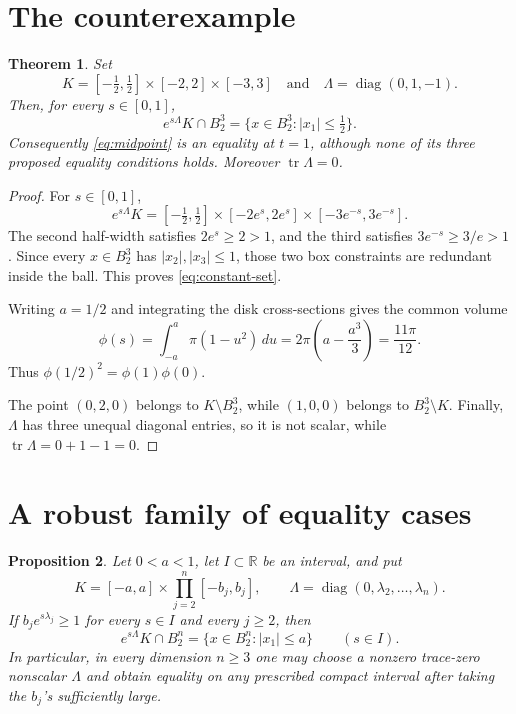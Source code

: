 \documentclass[11pt]{article}
\newtheorem{theorem}{Theorem}
\newtheorem{proposition}[theorem]{Proposition}
\newcommand{\B}{B_2}
\begin{document}
\section{The counterexample}

\begin{theorem}\label{thm:counterexample}
Set
\[
 K=[-\tfrac12,\tfrac12]\times[-2,2]\times[-3,3]
 \quad\text{and}\quad
 \Lambda=\operatorname{diag}(0,1,-1).
\]
Then, for every \(s\in[0,1]\),
\begin{equation}\label{eq:constant-set}
 e^{s\Lambda}K\cap\B^3
 =\{x\in\B^3:|x_1|\le\tfrac12\}.
\end{equation}
Consequently \eqref{eq:midpoint} is an equality at \(t=1\), although none
of its three proposed equality conditions holds.  Moreover
\(\operatorname{tr}\Lambda=0\).
\end{theorem}

\begin{proof}
For \(s\in[0,1]\),
\[
 e^{s\Lambda}K
 =[-\tfrac12,\tfrac12]\times[-2e^s,2e^s]
   \times[-3e^{-s},3e^{-s}].
\]
The second half-width satisfies \(2e^s\ge2>1\), and the third satisfies
\(3e^{-s}\ge3/e>1\).  Since every \(x\in\B^3\) has
\(|x_2|,|x_3|\le1\), those two box constraints are redundant inside the
ball.  This proves \eqref{eq:constant-set}.

Writing \(a=1/2\) and integrating the disk cross-sections gives the common
volume
\[
 \phi(s)=\int_{-a}^{a}\pi(1-u^2)\,du
 =2\pi\left(a-\frac{a^3}{3}\right)=\frac{11\pi}{12}.
\]
Thus \(\phi(1/2)^2=\phi(1)\phi(0)\).

The point \((0,2,0)\) belongs to \(K\setminus\B^3\), while
\((1,0,0)\) belongs to \(\B^3\setminus K\).  Finally, \(\Lambda\) has
three unequal diagonal entries, so it is not scalar, while
\(\operatorname{tr}\Lambda=0+1-1=0\).
\end{proof}

\section{A robust family of equality cases}

\begin{proposition}\label{prop:family}
Let \(0<a<1\), let \(I\subset\mathbb R\) be an interval, and put
\[
 K=[-a,a]\times\prod_{j=2}^n[-b_j,b_j],\qquad
 \Lambda=\operatorname{diag}(0,\lambda_2,\ldots,\lambda_n).
\]
If \(b_j e^{s\lambda_j}\ge1\) for every \(s\in I\) and every
\(j\ge2\), then
\[
 e^{s\Lambda}K\cap\B^n
 =\{x\in\B^n:|x_1|\le a\}
 \qquad(s\in I).
\]
In particular, in every dimension \(n\ge3\) one may choose a nonzero
trace-zero nonscalar \(\Lambda\) and obtain equality on any prescribed
compact interval after taking the \(b_j\)'s sufficiently large.
\end{proposition}
\end{document}
